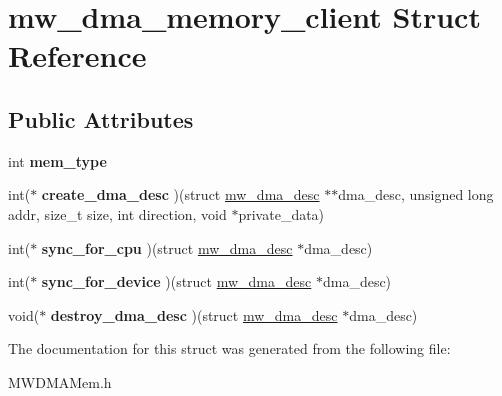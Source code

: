 \hypertarget{structmw__dma__memory__client}{\section{mw\-\_\-dma\-\_\-memory\-\_\-client Struct Reference}
\label{structmw__dma__memory__client}
}
\subsection*{Public Attributes}
\begin{DoxyCompactItemize}
\item 
\hypertarget{structmw__dma__memory__client_af5c5a3f8c5fb7cf17859bb8dcade0118}{int {\bfseries mem\-\_\-type}}\label{structmw__dma__memory__client_af5c5a3f8c5fb7cf17859bb8dcade0118}

\item 
\hypertarget{structmw__dma__memory__client_aa417f3cff701765cd9aeedbab127d305}{int($\ast$ {\bfseries create\-\_\-dma\-\_\-desc} )(struct \hyperlink{structmw__dma__desc}{mw\-\_\-dma\-\_\-desc} $\ast$$\ast$dma\-\_\-desc, unsigned long addr, size\-\_\-t size, int direction, void $\ast$private\-\_\-data)}\label{structmw__dma__memory__client_aa417f3cff701765cd9aeedbab127d305}

\item 
\hypertarget{structmw__dma__memory__client_a4fb1edad80d3cd8c6ba8d80fa93a9153}{int($\ast$ {\bfseries sync\-\_\-for\-\_\-cpu} )(struct \hyperlink{structmw__dma__desc}{mw\-\_\-dma\-\_\-desc} $\ast$dma\-\_\-desc)}\label{structmw__dma__memory__client_a4fb1edad80d3cd8c6ba8d80fa93a9153}

\item 
\hypertarget{structmw__dma__memory__client_a35cc8613bf29d353e27ffecbe2951174}{int($\ast$ {\bfseries sync\-\_\-for\-\_\-device} )(struct \hyperlink{structmw__dma__desc}{mw\-\_\-dma\-\_\-desc} $\ast$dma\-\_\-desc)}\label{structmw__dma__memory__client_a35cc8613bf29d353e27ffecbe2951174}

\item 
\hypertarget{structmw__dma__memory__client_ab204c329e26aad61665beff8fcec29c0}{void($\ast$ {\bfseries destroy\-\_\-dma\-\_\-desc} )(struct \hyperlink{structmw__dma__desc}{mw\-\_\-dma\-\_\-desc} $\ast$dma\-\_\-desc)}\label{structmw__dma__memory__client_ab204c329e26aad61665beff8fcec29c0}

\end{DoxyCompactItemize}


The documentation for this struct was generated from the following file\-:\begin{DoxyCompactItemize}
\item 
M\-W\-D\-M\-A\-Mem.\-h\end{DoxyCompactItemize}
